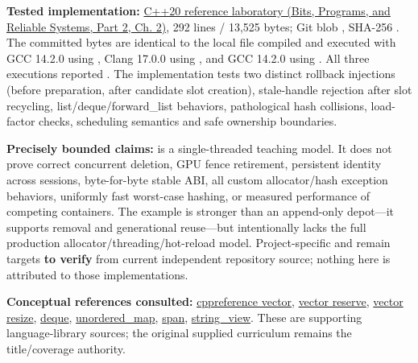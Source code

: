 \textbf{Tested implementation:} \href{../01-Bits-Programs-and-Reliable-Systems-P02/main.pdf\#nameddest=source-file-e829cf731b17419e282775cf}{C++20 reference laboratory (Bits, Programs, and Reliable Systems, Part 2, Ch. 2)}, 292 lines / 13,525 bytes; Git blob , SHA-256 . The committed bytes are identical to the local file compiled and executed with GCC 14.2.0 using , Clang 17.0.0 using , and GCC 14.2.0 using . All three executions reported . The implementation tests two distinct rollback injections (before preparation, after candidate slot creation), stale-handle rejection after slot recycling, list/deque/forward\_list behaviors, pathological hash collisions, load-factor checks, scheduling semantics and safe ownership boundaries.

\textbf{Precisely bounded claims:}  is a single-threaded teaching model. It does not prove correct concurrent deletion, GPU fence retirement, persistent identity across sessions, byte-for-byte stable ABI, all custom allocator/hash exception behaviors, uniformly fast worst-case hashing, or measured performance of competing containers. The example is stronger than an append-only depot---it supports removal and generational reuse---but intentionally lacks the full production allocator/threading/hot-reload model. Project-specific  and  remain targets \textbf{to verify} from current independent repository source; nothing here is attributed to those implementations.

\textbf{Conceptual references consulted:} \href{https://en.cppreference.com/w/cpp/container/vector}{cppreference vector}, \href{https://en.cppreference.com/cpp/container/vector/reserve}{vector reserve}, \href{https://en.cppreference.com/cpp/container/vector/resize}{vector resize}, \href{https://en.cppreference.com/w/cpp/container/deque}{deque}, \href{https://en.cppreference.com/cpp/container/unordered_map}{unordered\_map}, \href{https://en.cppreference.com/w/cpp/container/span}{span}, \href{https://en.cppreference.com/w/cpp/string/basic_string_view}{string\_view}. These are supporting language-library sources; the original supplied curriculum remains the title/coverage authority.

